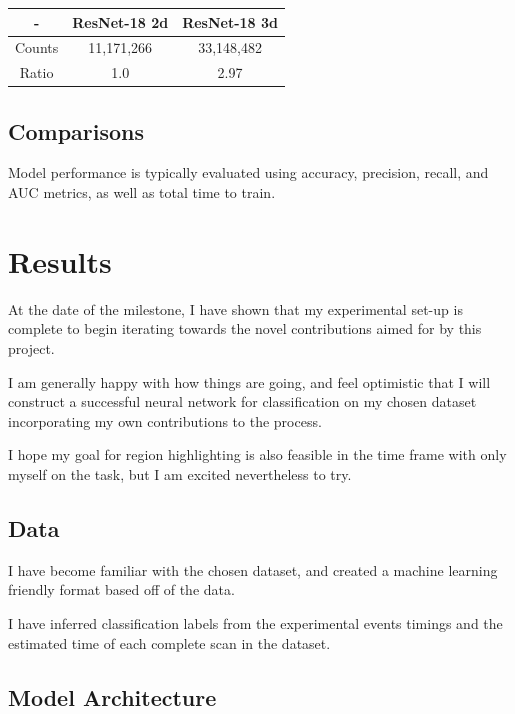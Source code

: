 \documentclass[10pt,twocolumn,letterpaper]{article}
\begin{document}
\begin{center}
 \begin{tabular}{||c c c||}
 \hline
 - & ResNet-18 2d & ResNet-18 3d \\ [0.5ex]
 \hline\hline
 Counts & 11,171,266 & 33,148,482 \\ [1ex]
 \hline
 Ratio & 1.0 & 2.97 \\ [1ex]
 \hline
\end{tabular}
\end{center}

\subsection{Comparisons}\label{subsec:comparisons}

Model performance is typically evaluated using accuracy, precision, recall, and AUC metrics, as well as total time to
train.



\section{Results}\label{sec:results}
At the date of the milestone, I have shown that my experimental set-up is complete to begin
iterating towards the novel contributions aimed for by this project.

I am generally happy with how things are going, and feel optimistic that I will construct a successful neural
network for classification on my chosen dataset incorporating my own contributions to the process.

I hope my goal for region highlighting is also feasible in the time frame with only myself on the task, but I am
excited nevertheless to try.

\subsection{Data}\label{subsec:data}
I have become familiar with the chosen dataset, and created a machine learning friendly format
based off of the data.

I have inferred classification labels from the experimental events timings and the estimated time
of each complete scan in the dataset.


\subsection{Model Architecture}\label{subsec:model-arch}
\end{document}

